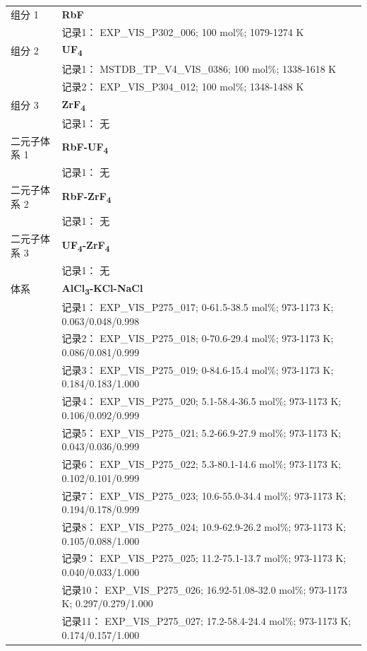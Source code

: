 \documentclass[12pt]{article}
\begin{document}
{\begin{longtable}[]{@{}
  >{\raggedright\arraybackslash}p{}
  >{\raggedright\arraybackslash}p{}@{}}
组分 1  & \textbf{RbF} \\
 & 记录1： EXP\_VIS\_P302\_006; 100 mol\%; 1079-1274 K  \\

组分 2  & \textbf{UF\textsubscript{4}} \\
 & 记录1： MSTDB\_TP\_V4\_VIS\_0386; 100 mol\%; 1338-1618 K \\
 & 记录2： EXP\_VIS\_P304\_012; 100 mol\%; 1348-1488 K  \\

组分 3 & \textbf{ZrF\textsubscript{4}} \\
 & 记录1： 无 \\
二元子体系 1 & \textbf{RbF-UF\textsubscript{4}} \\
 & 记录1： 无 \\
二元子体系 2 & \textbf{RbF-ZrF\textsubscript{4}} \\
 & 记录1： 无 \\
二元子体系 3 & \textbf{UF\textsubscript{4}-ZrF\textsubscript{4}} \\
 & 记录1： 无 \\
\midrule
体系 & \textbf{AlCl\textsubscript{3}-KCl-NaCl} \\
 & 记录1： EXP\_VIS\_P275\_017; 0-61.5-38.5 mol\%; 973-1173 K; 0.063/0.048/0.998 \\
 & 记录2： EXP\_VIS\_P275\_018; 0-70.6-29.4 mol\%; 973-1173 K; 0.086/0.081/0.999 \\
 & 记录3： EXP\_VIS\_P275\_019; 0-84.6-15.4 mol\%; 973-1173 K; 0.184/0.183/1.000 \\
 & 记录4： EXP\_VIS\_P275\_020; 5.1-58.4-36.5 mol\%; 973-1173 K; 0.106/0.092/0.999 \\
 & 记录5： EXP\_VIS\_P275\_021; 5.2-66.9-27.9 mol\%; 973-1173 K; 0.043/0.036/0.999 \\
 & 记录6： EXP\_VIS\_P275\_022; 5.3-80.1-14.6 mol\%; 973-1173 K; 0.102/0.101/0.999 \\
 & 记录7： EXP\_VIS\_P275\_023; 10.6-55.0-34.4 mol\%; 973-1173 K; 0.194/0.178/0.999 \\
 & 记录8： EXP\_VIS\_P275\_024; 10.9-62.9-26.2 mol\%; 973-1173 K; 0.105/0.088/1.000 \\
 & 记录9： EXP\_VIS\_P275\_025; 11.2-75.1-13.7 mol\%; 973-1173 K; 0.040/0.033/1.000 \\
 & 记录10： EXP\_VIS\_P275\_026; 16.92-51.08-32.0 mol\%; 973-1173 K; 0.297/0.279/1.000 \\
 & 记录11： EXP\_VIS\_P275\_027; 17.2-58.4-24.4 mol\%; 973-1173 K; 0.174/0.157/1.000 \\

\end{longtable}}
\end{document}
